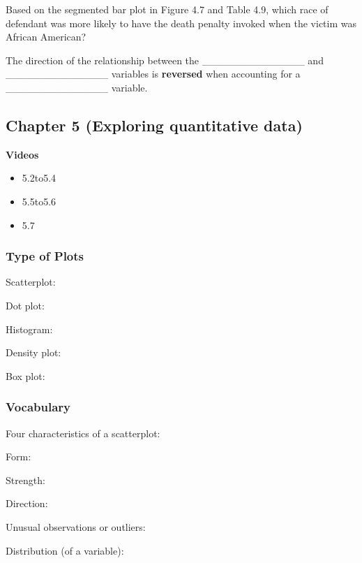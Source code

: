 \documentclass[
]{report}
\providecommand{\tightlist}{%
  \setlength{\itemsep}{0pt}\setlength{\parskip}{0pt}}
\newcommand{\rgs}{\vspace{12pt}} %
\newcommand{\rgi}{\hspace{24pt}}  %
\begin{document}
Based on the segmented bar plot in Figure 4.7 and Table 4.9, which race of defendant was more likely to have the death penalty invoked when the victim was African American?
\rgs

The direction of the relationship between the \_\_\_\_\_\_\_\_\_\_\_\_\_\_
and \_\_\_\_\_\_\_\_\_\_\_\_\_\_ variables is \textbf{reversed} when accounting for
a \_\_\_\_\_\_\_\_\_\_\_\_\_\_ variable.
\rgs

\hypertarget{chapter-5-exploring-quantitative-data}{%
\subsection*{Chapter 5 (Exploring quantitative data)}\label{chapter-5-exploring-quantitative-data}}

\textbf{Videos}

\begin{itemize}
\tightlist
\item
  5.2to5.4
\item
  5.5to5.6
\item
  5.7
\end{itemize}

\hypertarget{type-of-plots}{%
\subsubsection*{Type of Plots}\label{type-of-plots}}

Scatterplot:
\rgs

Dot plot:
\rgs

Histogram:
\rgs

Density plot:
\rgs

Box plot:
\rgs

\hypertarget{vocabulary-4}{%
\subsubsection*{Vocabulary}\label{vocabulary-4}}

Four characteristics of a scatterplot:

\rgi Form:
\rgs

\rgi Strength:
\rgs

\rgi Direction:
\rgs

\rgi Unusual observations or outliers:
\rgs

Distribution (of a variable):
\rgs
\end{document}
